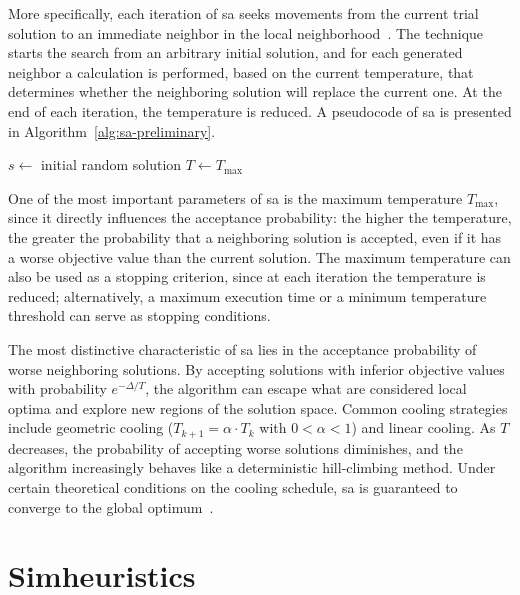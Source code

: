 More specifically, each iteration of \gls{sa} seeks movements from the current
trial solution to an immediate neighbor in the local
neighborhood~\cite{hillier:2013}. The technique starts the search from an
arbitrary initial solution, and for each generated neighbor a calculation is
performed, based on the current temperature, that determines whether the
neighboring solution will replace the current one. At the end of each iteration,
the temperature is reduced. A pseudocode of \gls{sa} is presented in
Algorithm~\ref{alg:sa-preliminary}.

\begin{algorithm}[!ht]
	\caption{\label{alg:sa-preliminary} Simulated Annealing}
	\SetAlgoLined
	$s \leftarrow$ initial random solution\;
	$T \leftarrow T_{\max}$\;
\end{algorithm}

One of the most important parameters of \gls{sa} is the maximum temperature
$T_{\max}$, since it directly influences the acceptance probability: the higher
the temperature, the greater the probability that a neighboring solution is
accepted, even if it has a worse objective value than the current solution. The
maximum temperature can also be used as a stopping criterion, since at each
iteration the temperature is reduced; alternatively, a maximum execution time
or a minimum temperature threshold can serve as stopping conditions.

The most distinctive characteristic of \gls{sa} lies in the acceptance
probability of worse neighboring solutions. By accepting solutions with inferior
objective values with probability $e^{-\Delta / T}$, the algorithm can escape
what are considered local optima and explore new regions of the solution space.
Common cooling strategies include geometric cooling ($T_{k+1} = \alpha \cdot
T_k$ with $0 < \alpha < 1$) and linear cooling. As $T$ decreases, the
probability of accepting worse solutions diminishes, and the algorithm
increasingly behaves like a deterministic hill-climbing method. Under certain
theoretical conditions on the cooling schedule, \gls{sa} is guaranteed to
converge to the global optimum~\cite{kirkpatrick:1983}.

\section{Simheuristics}\label{sec:simheuristics}

